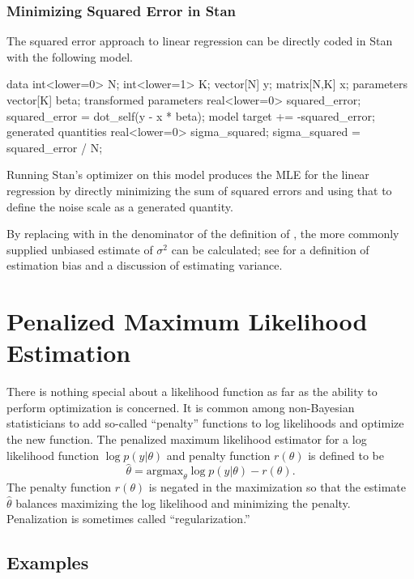 \subsubsection{Minimizing Squared Error in Stan}

The squared error approach to linear regression can be directly coded
in Stan with the following model.
%
\begin{stancode}
data {
  int<lower=0> N;
  int<lower=1> K;
  vector[N] y;
  matrix[N,K] x;
}
parameters {
  vector[K] beta;
}
transformed parameters {
  real<lower=0> squared_error;
  squared_error = dot_self(y - x * beta);
}
model {
  target += -squared_error;
}
generated quantities {
  real<lower=0> sigma_squared;
  sigma_squared = squared_error / N;
}
\end{stancode}
%
Running Stan's optimizer on this model produces the MLE for the linear
regression by directly minimizing the sum of squared errors and using
that to define the noise scale as a generated quantity.

By replacing  with  in the denominator of the
definition of , the more commonly supplied
unbiased estimate of $\sigma^2$ can be calculated; see
 for a definition of estimation bias and a
discussion of estimating variance.



\section{Penalized Maximum Likelihood Estimation}

There is nothing special about a likelihood function as far as the
ability to perform optimization is concerned.  It is common among
non-Bayesian statisticians to add so-called ``penalty'' functions
to log likelihoods and optimize the new function.  The penalized
maximum likelihood estimator for a log likelihood function
$\log p(y|\theta)$ and penalty function $r(\theta)$ is defined to be
\[
\hat{\theta} = \mbox{argmax}_{\theta} \log p(y|\theta) - r(\theta).
\]
The penalty function $r(\theta)$ is negated in the maximization so
that the estimate $\hat{\theta}$ balances maximizing the log
likelihood and minimizing the penalty.  Penalization is sometimes
called ``regularization.''


\subsection{Examples}\label{penalized-mle-examples}

